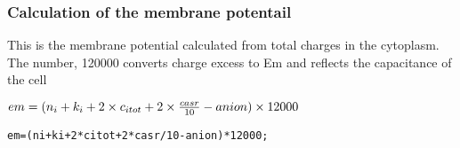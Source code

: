\documentclass[11pt]{article}
\begin{document}
    \subsubsection{Calculation of the membrane
potentail}\label{calculation-of-the-membrane-potentail}

This is the membrane potential calculated from total charges in the
cytoplasm. The number, 120000 converts charge excess to Em and reflects
the capacitance of the cell

    \(\large em = (n_i+k_i+2 \times c_{itot}+ 2 \times\frac{casr}{10}-anion) \times 12000\)

    \texttt{em=(ni+ki+2*citot+2*casr/10-anion)*12000;}


    
    
    
    
\end{document}
